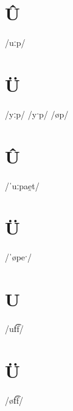 \documentclass[10pt,a4paper,twoside]{book}
\begin{document}
\section*{Û}

\begin{multicols}{3}
 {/uːp/} {}
\end{multicols}

\section*{Ü}

\begin{multicols}{3}
 {/yːp/} {}
 {/yˑp/} {}
 {/øp/} {}
\end{multicols}

\section*{Û}

\begin{multicols}{3}
 {/ˈuːpae̯t/} {}
\end{multicols}

\section*{Ü}

\begin{multicols}{3}
 {/ˈøpeˑ/} {}
\end{multicols}

\section*{U}

\begin{multicols}{3}
 {/uf͡f/} {}
\end{multicols}

\section*{Ü}

\begin{multicols}{3}
 {/øf͡f/} {}
\end{multicols}
\end{document}

